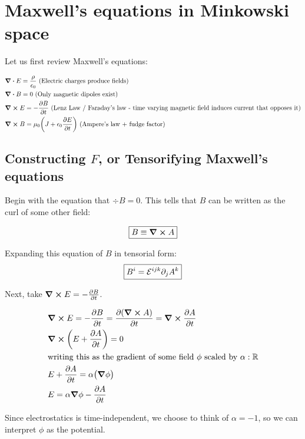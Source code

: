 \chapter{Maxwell's equations in Minkowski space}

Let us first review Maxwell's equations:

\begin{align*}
&\div E = \frac{\rho}{\epsilon_0}~\text{(Electric charges produce fields)}\\
&\div B = 0~\text{(Only magnetic dipoles exist)}\\
&\curl E = - \pdv{B}{t}~\text{(Lenz Law / Faraday's law - time varying magnetic field induces current that opposes it)} \\
&\curl B =  \mu_0 \bigg(J + \epsilon_0 \pdv{E}{t} \bigg)~\text{(Ampere's law + fudge factor)}
\end{align*}

\section{Constructing $F$, or Tensorifying Maxwell's equations}

Begin with the equation that $\div B = 0$. This tells that $B$ can be written
as the curl of some other field:

\begin{equation}
    \boxed{B \equiv \curl A}
\end{equation}

Expanding this equation of $B$ in tensorial form:
\begin{equation}
    \boxed{ B^i = \mathcal{E}^{ijk}  \partial_j A^k }
\end{equation}

Next, take $\curl E = - \pdv{B}{t}$.


\begin{align*}
&\curl E = - \pdv{B}{t} = \pdv{(\curl A)}{t} = \curl{\pdv{A}{t}} \\
&\curl (E + \pdv{A}{t}) = 0 \\
&\text{writing this as the gradient of some field $\phi$ scaled by $\alpha : \mathbb{R}$} \\
&E + \pdv{A}{t} = \alpha \big(\grad \phi\big) \\
&E = \alpha \grad \phi - \pdv{A}{t}
\end{align*}

Since electrostatics is time-independent, we choose to think of $\alpha = -1$, 
so we can interpret $\phi$ as the potential.

